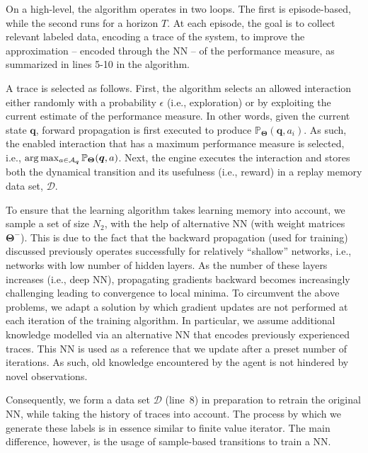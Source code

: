 On a high-level, the algorithm operates in two loops. The first is episode-based, while the second runs for a horizon $T$. At each episode, the goal is to collect relevant labeled data, encoding a trace of the system, to improve the approximation -- encoded through the NN -- of the performance measure, as summarized in lines 5-10 in the algorithm. 

A trace is selected as follows. First, the algorithm selects an allowed interaction either randomly with a probability $\epsilon$ (i.e., exploration) or by exploiting the current estimate of the performance measure. In other words, given the current state $ \bm{q}$, forward propagation is first executed to produce  $\mathbb{P}_{\bm{\Theta}}( \bm{q},a_i)$. As such, the enabled interaction that has a maximum performance measure is selected, i.e., $\arg\max_{a\in {\cal A}_{\bm{q}}} \mathbb{P}_{\bm{\Theta}}(\bm{q},a)$. 
Next, the engine executes the interaction and stores both the dynamical transition and its usefulness (i.e., reward) in a replay memory data set, $\mathcal{D}$. 

To ensure that the learning algorithm takes learning memory into account, we sample a set of size $N_{2}$, with the help of alternative NN (with weight matrices $\bm{\Theta}^{-}$). This is due to the fact that the backward propagation (used for training) discussed previously operates successfully for relatively ``shallow'' networks, i.e., networks with low number of hidden layers. As the number of these layers increases (i.e., deep NN), propagating gradients backward becomes increasingly challenging leading to convergence to local minima. To circumvent the above problems, we adapt a solution by which gradient updates are not performed at each iteration of the training algorithm. In particular, we assume additional knowledge modelled via an alternative NN that encodes previously experienced traces. This NN is used as a reference that we update after a preset number of iterations. As such, old knowledge encountered by the agent is not hindered by novel observations. 

Consequently, we form a data set $\mathcal{D}$  (line~8)  in preparation to retrain the original NN, while taking the history of traces into account. The process by which we generate these labels is in essence similar to finite value iterator. The main difference, however, is the usage of sample-based transitions to train a NN.  



